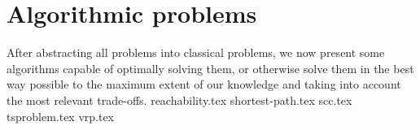 \chapter{Algorithmic problems} \label{algorithm}
After abstracting all problems into classical problems, we now present some algorithms capable of optimally solving them, or otherwise solve them in the best way possible to the maximum extent of our knowledge and taking into account the most relevant trade-offs.
{reachability.tex}
{shortest-path.tex}
{scc.tex}
{tsproblem.tex}
{vrp.tex}
